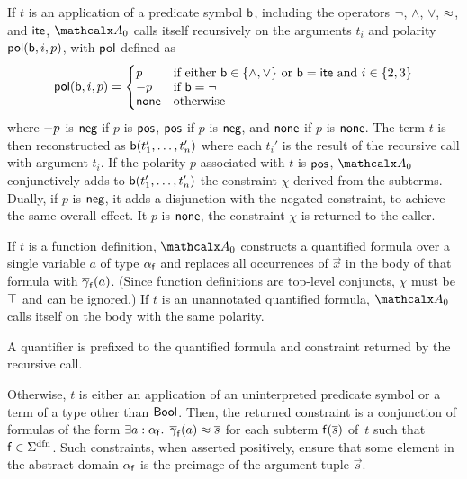 If $t$ is an application of a predicate symbol $\mathsf{b}$, including the
operators ${\oldneg}$, ${\wedge}$, ${\vee}$, ${\approx}$, and ${\mathsf{ite}}$,
$\conv_0$ calls itself recursively on the arguments $t_i$ and polarity $\mathsf{pol}(
\mathsf{b}, i, p )$, with $\mathsf{pol}$ defined as
\[\pol( \boolop, i, p ) =
\begin{cases}
p & \text{if either $\boolop \in \{{\wedge}, {\vee}\}$ or $\boolop = \lite$ and $i \in \{2, 3\}$} \\[-\jot]
\pnegate p & \text{if $\boolop = {\neg}$} \\[-\jot]
\pnone & \text{otherwise}
\end{cases}\]
where $- p$ is $\mathsf{neg}$ if $p$ is $\mathsf{pos}$, $\mathsf{pos}$
if $p$ is $\mathsf{neg}$, and $\mathsf{none}$ if $p$ is $\mathsf{none}$.
The term $t$ is then reconstructed as $\mathsf{b}(t_1',\ldots,t_n')$ 
where each $t_i'$ is the result of the recursive call with argument $t_i$. 
If the polarity $p$ associated with $t$ is $\mathsf{pos}$, 
$\conv_0$ conjunctively adds to $\mathsf{b}(t_1',\ldots,t_n')$ the constraint $\chi$ derived from
the subterms. Dually, if $p$ is $\mathsf{neg}$, it adds a
disjunction with the negated constraint, to achieve the same overall effect.
It $p$ is $\mathsf{none}$, the constraint $\chi$ is
returned to the caller.
%
\begin{longv}\par\end{longv}
%
If $t$ is a function definition, %
$\conv_0$ constructs a quantified formula over a single variable
$a$ of type $\alpha_{\mathsf{f}}$ and replaces all occurrences of $\vec x$ in
the body of that formula with $\overline{\gamma}_{\mathsf{f}}( a )$. 
(Since function definitions are top-level conjuncts, %
$\chi$ must be $\top$ and can be ignored.)
%
If $t$ is an unannotated quantified formula, $\conv_0$ calls itself
on the body with the same polarity. \begin{longv}A quantifier is prefixed to the
quantified formula and constraint returned by the recursive call.\end{longv}
Otherwise, $t$ is either an application of an uninterpreted predicate symbol or a term
of a type other than $\mathsf{Bool}$. Then, the returned constraint is a conjunction of
formulas of the form $\exists a : {\alpha_{\mathsf{f}}}.\;\, \overline{\gamma}_{\mathsf{f}}(
a ) \approx \overline{s}$ for each subterm $\mathsf{f}( \overline{s} )$ of~$t$ such that $\con{f}
\in \sfundefs{\Sigma}$. Such constraints, when asserted positively, ensure that
some element in the abstract domain $\alpha_{\mathsf{f}}$ is the preimage of
the argument tuple $\vec s$. %

